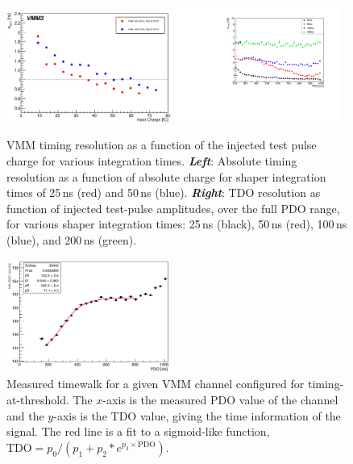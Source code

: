\begin{figure}[!htb]
    \begin{center}
        \includegraphics[width=0.48\textwidth]{figures/nsw/calibration/res_v_charge}
        \includegraphics[width=0.48\textwidth]{figures/nsw/calibration/nsw_time_res}
        \caption{
            VMM timing resolution as a function of the injected test pulse charge
            for various integration times.
            \textbf{\textit{Left}}: Absolute timing resolution as a function of absolute charge
                for shaper integration times of 25\,ns (red) and 50\,ns (blue).
            \textbf{\textit{Right}}: TDO resolution as function of injected test-pulse
                amplitudes, over the full PDO range, for various shaper integration times: 25\,ns (black), 50\,ns (red),
                100\,ns (blue), and 200\,ns (green).
        }
        \label{fig:time_res}
    \end{center}
\end{figure}


\begin{figure}[!htb]
    \begin{center}
        \includegraphics[width=0.48\textwidth]{figures/nsw/calibration/time_walk}
        \caption{
            Measured timewalk for a given VMM channel configured for timing-at-threshold.
            The $x$-axis is the measured PDO value of the channel and the $y$-axis is the
            TDO value, giving the time information of the signal.
            The red line is a fit to a sigmoid-like function, $\text{TDO} =  p_0 / (p_1 + p_2 * e^{p_3 \times \text{PDO}})$.
        }
        \label{fig:time_walk}
    \end{center}
\end{figure}

